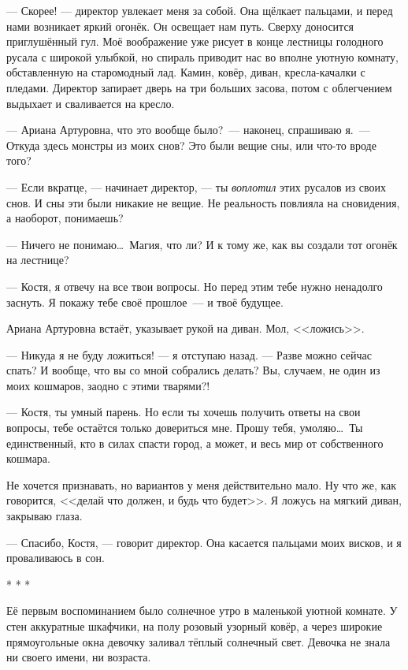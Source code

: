 \documentclass[openany, oneside]{book}
\begin{document}
--- Скорее! --- директор увлекает меня за собой. Она щёлкает пальцами, и перед нами возникает яркий огонёк. Он освещает нам путь. Сверху доносится приглушённый гул. Моё воображение уже рисует в конце лестницы голодного русала с широкой улыбкой, но спираль приводит нас во вполне уютную комнату, обставленную на старомодный лад. Камин, ковёр, диван, кресла-качалки с пледами. Директор запирает дверь на три больших засова, потом с облегчением выдыхает и сваливается на кресло.

--- Ариана Артуровна, что это вообще было?~--- наконец, спрашиваю я.~--- Откуда здесь монстры из моих снов? Это были вещие сны, или что-то вроде того?

--- Если вкратце, --- начинает директор, --- ты \textit{воплотил} этих русалов из своих снов. И сны эти были никакие не вещие. Не реальность повлияла на сновидения, а наоборот, понимаешь?

--- Ничего не понимаю\dots \ Магия, что ли? И к тому же, как вы создали тот огонёк на лестнице?

--- Костя, я отвечу на все твои вопросы. Но перед этим тебе нужно ненадолго заснуть. Я покажу тебе своё прошлое~--- и твоё будущее.

Ариана Артуровна встаёт, указывает рукой на диван. Мол, <<ложись>>.

--- Никуда я не буду ложиться! --- я отступаю назад. --- Разве можно сейчас спать? И вообще, что вы со мной собрались делать? Вы, случаем, не один из моих кошмаров, заодно с этими тварями?!

--- Костя, ты умный парень. Но если ты хочешь получить ответы на свои вопросы, тебе остаётся только довериться мне. Прошу тебя, умоляю\dots \ Ты единственный, кто в силах спасти город, а может, и весь мир от собственного кошмара.

Не хочется признавать, но вариантов у меня действительно мало. Ну что же, как говорится, <<делай что должен, и будь что будет>>. Я ложусь на мягкий диван, закрываю глаза.

--- Спасибо, Костя, --- говорит директор. Она касается пальцами моих висков, и я проваливаюсь в сон.

\begin{center}
    * * *
\end{center}

Её первым воспоминанием было солнечное утро в маленькой уютной комнате. У стен аккуратные шкафчики, на полу розовый узорный ковёр, а через широкие прямоугольные окна девочку заливал тёплый солнечный свет. Девочка не знала ни своего имени, ни возраста.
\end{document}
